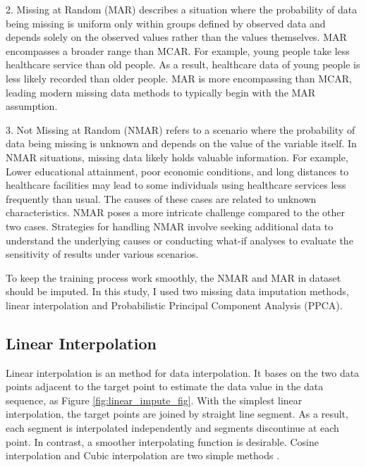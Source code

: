 \documentclass[12pt,a4paper,english
]{tunithesis}
\begin{document}
2. Missing at Random (MAR) describes a situation where the probability of data being missing is uniform only within groups defined by observed data and depends solely on the observed values rather than the values themselves. MAR encompasses a broader range than MCAR. For example, young people take less healthcare service than old people. As a result, healthcare data of young people is less likely recorded than older people. MAR is more encompassing than MCAR, leading modern missing data methods to typically begin with the MAR assumption.

3. Not Missing at Random (NMAR) refers to a scenario where the probability of data being missing is unknown and depends on the value of the variable itself. In NMAR situations, missing data likely holds valuable information. For example, Lower educational attainment, poor economic conditions, and long distances to healthcare facilities may lead to some individuals using healthcare services less frequently than usual. The causes of these cases are related to unknown characteristics. NMAR poses a more intricate challenge compared to the other two cases. Strategies for handling NMAR involve seeking additional data to understand the underlying causes or conducting what-if analyses to evaluate the sensitivity of results under various scenarios.\parencite{vanbuuren2018, Pedersen2017}

To keep the training process work smoothly, the NMAR and MAR in dataset should be imputed. In this study, I used two missing data imputation methods, linear interpolation and Probabilistic Principal Component Analysis (PPCA).

\subsection{Linear Interpolation}
Linear interpolation is an method for data interpolation. It bases on the two data points adjacent to the target point to estimate the data value in the data sequence, as Figure \ref{fig:linear_impute_fig}. With the simplest linear interpolation, the target points are joined by straight line segment. As a result, each segment is interpolated independently and segments discontinue at each point. \parencite{huang2021, paul1999}
In contrast, a smoother interpolating function is desirable. Cosine interpolation and Cubic interpolation are two simple methods \parencite{paul1999}.
\end{document}
